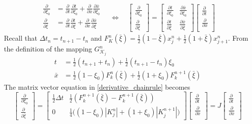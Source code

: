 \documentclass[11pt, oneside]{article}   	%
\begin{document}
\begin{equation}\label{derivative_chainrule}
\begin{split}
	\frac{\partial}{\partial \xi_0} &= \frac{\partial}{\partial t}\frac{\partial t}{\partial \xi_0} + \frac{\partial}{\partial \bar{x}} \frac{\partial \bar{x}}{\partial \xi_0} \\
	\frac{\partial}{\partial \bar{\xi}} &= \frac{\partial}{\partial t} \frac{\partial t}{\partial \bar{\xi}} + \frac{\partial}{\partial \bar{x}} \frac{\partial \bar{x}}{\partial \bar{\xi}}\\
\end{split}
\quad
\iff
\quad
\begin{bmatrix}
	\frac{\partial}{\partial \xi_0}\\
	\frac{\partial}{\partial \bar{\xi}}
\end{bmatrix}
=
\begin{bmatrix}
	\frac{\partial t}{\partial \xi_0} & \frac{\partial \bar{x}}{\partial \xi_0}\\
	\frac{\partial t}{\partial \bar{\xi}} & \frac{\partial \bar{x}}{\partial \bar{\xi}}
\end{bmatrix}
\begin{bmatrix}
	\frac{\partial}{\partial t}\\
	\frac{\partial}{\partial \bar{x}}\\
\end{bmatrix}
\end{equation}
Recall that $\Delta t_n = t_{n+1} - t_n$ and $F_K^n(\bar{\xi}) = \frac{1}{2}(1 - \bar{\xi})x_j^n + \frac{1}{2}(1 + \bar{\xi})x_{j+1}^n$.
From the definition of the mapping $G_{\mathcal{K}_j}^n$
\begin{equation*}
\begin{split}
t &= \frac{1}{2}(t_{n+1}+t_n) + \frac{1}{2}(t_{n+1}-t_n)\xi_0 \\
\bar{x} &= \frac{1}{2}(1-\xi_0)F_k^n(\bar{\xi}) + \frac{1}{2}(1+\xi_0)F_k^{n+1}(\bar{\xi})
\end{split}
\end{equation*}
The matrix vector equation in \eqref{derivative_chainrule} becomes
\begin{equation*}
\begin{bmatrix}
	\frac{\partial}{\partial \xi_0}\\
	\frac{\partial}{\partial \bar{\xi}}
\end{bmatrix}
=
\begin{bmatrix}
	\frac{1}{2}\Delta t  & \frac{1}{2}(F_k^{n+1}(\bar{\xi}) - F_k^{n+1}(\bar{\xi})) \\
	0 & \frac{1}{4}\big( (1-\xi_0)|K_j^n| + (1+\xi_0)|K_j^{n+1}| \big)
\end{bmatrix}
\begin{bmatrix}
	\frac{\partial}{\partial t}\\
	\frac{\partial}{\partial \bar{x}}\\
\end{bmatrix}
=
J
\begin{bmatrix}
	\frac{\partial}{\partial t}\\
	\frac{\partial}{\partial \bar{x}}\\
\end{bmatrix}
\end{equation*}
\end{document}
